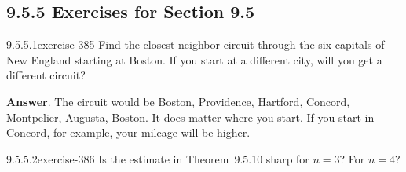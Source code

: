 \documentclass[twoside,10pt,]{book}
\numberwithin{equation}{section}
\begin{document}
\subsection*{9.5.5 Exercises for Section 9.5}
\begin{divisionsolution}{9.5.5.1}{}{exercise-385}%
\hypertarget{p-3374}{}%
Find the closest neighbor circuit through the six capitals of New England starting at Boston. If you start at a different city, will you get a different circuit?%
\par\smallskip%
\noindent\textbf{Answer}.\quad%
\hypertarget{p-3375}{}%
The circuit would be Boston, Providence, Hartford, Concord, Montpelier, Augusta, Boston. It does matter where you start. If you start in Concord, for example, your mileage will be higher.%
\end{divisionsolution}%
\begin{divisionsolution}{9.5.5.2}{}{exercise-386}%
\hypertarget{p-3376}{}%
Is the estimate in Theorem~9.5.10 sharp for \(n = 3\)? For \(n = 4\)?%
\end{divisionsolution}%
\end{document}
